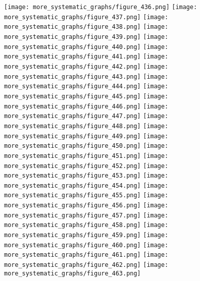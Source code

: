\documentclass{Assignment}
\begin{document}
\texttt{[image: more\_systematic\_graphs/figure\_436.png]}
\texttt{[image: more\_systematic\_graphs/figure\_437.png]}
\texttt{[image: more\_systematic\_graphs/figure\_438.png]}
\texttt{[image: more\_systematic\_graphs/figure\_439.png]}
\texttt{[image: more\_systematic\_graphs/figure\_440.png]}
\texttt{[image: more\_systematic\_graphs/figure\_441.png]}
\texttt{[image: more\_systematic\_graphs/figure\_442.png]}
\texttt{[image: more\_systematic\_graphs/figure\_443.png]}
\texttt{[image: more\_systematic\_graphs/figure\_444.png]}
\texttt{[image: more\_systematic\_graphs/figure\_445.png]}
\texttt{[image: more\_systematic\_graphs/figure\_446.png]}
\texttt{[image: more\_systematic\_graphs/figure\_447.png]}
\texttt{[image: more\_systematic\_graphs/figure\_448.png]}
\texttt{[image: more\_systematic\_graphs/figure\_449.png]}
\texttt{[image: more\_systematic\_graphs/figure\_450.png]}
\texttt{[image: more\_systematic\_graphs/figure\_451.png]}
\texttt{[image: more\_systematic\_graphs/figure\_452.png]}
\texttt{[image: more\_systematic\_graphs/figure\_453.png]}
\texttt{[image: more\_systematic\_graphs/figure\_454.png]}
\texttt{[image: more\_systematic\_graphs/figure\_455.png]}
\texttt{[image: more\_systematic\_graphs/figure\_456.png]}
\texttt{[image: more\_systematic\_graphs/figure\_457.png]}
\texttt{[image: more\_systematic\_graphs/figure\_458.png]}
\texttt{[image: more\_systematic\_graphs/figure\_459.png]}
\texttt{[image: more\_systematic\_graphs/figure\_460.png]}
\texttt{[image: more\_systematic\_graphs/figure\_461.png]}
\texttt{[image: more\_systematic\_graphs/figure\_462.png]}
\texttt{[image: more\_systematic\_graphs/figure\_463.png]}
\end{document}
